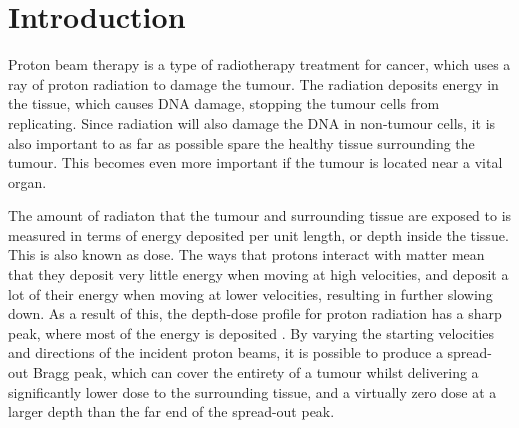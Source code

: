 \section{Introduction}


Proton beam therapy is a type of radiotherapy treatment for cancer, which uses a ray of proton radiation to damage the tumour. The radiation deposits energy in the tissue, which causes DNA damage, stopping the tumour cells from replicating. Since radiation will also damage the DNA in non-tumour cells, it is also important to as far as possible spare the healthy tissue surrounding the tumour. This becomes even more important if the tumour is located near a vital organ. 

The amount of radiaton that the tumour and surrounding tissue are exposed to is measured in terms of energy deposited per unit length, or depth inside the tissue. This is also known as dose. The ways that protons interact with matter mean that they deposit very little energy when moving at high velocities, and deposit a lot of their energy when moving at lower velocities, resulting in further slowing down. As a result of this, the depth-dose profile for proton radiation has a sharp peak, where most of the energy is deposited \cite{newhauser2015physics}. By varying the starting velocities and directions of the incident proton beams, it is possible to produce a spread-out Bragg peak, which can cover the entirety of a tumour whilst delivering a significantly lower dose to the surrounding tissue, and a virtually zero dose at a larger depth than the far end of the spread-out peak. 

